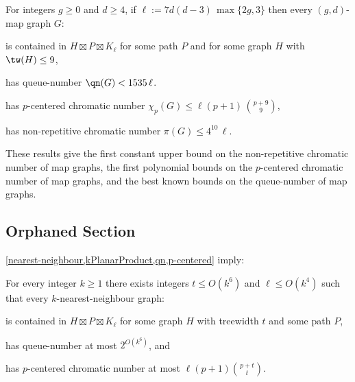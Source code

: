  \begin{thm}
 \label{MapPartition}
 For integers $g\geq 0$ and $d\geq 4$, if $\ell:=  7d(d-3)\, \max\{2g,3\}$ then every $(g,d)$-map graph $G$:
 \begin{compactitem}
 \item is contained in $H \boxtimes P \boxtimes K_{\ell}$ for some path $P$ and for some graph $H$ with $\tw(H)\leq 9$,
 \item has queue-number $\qn(G) <  1535\, \ell $.
 \item has $p$-centered chromatic number $\chi_p(G) \leq \ell (p+1)\,  \binom{p+9}{9}$,
 \item has non-repetitive chromatic number $ \pi(G) \leq 4^{10}\,\ell $.
 \end{compactitem}
 \end{thm}

 These results give the first constant upper bound on the non-repetitive chromatic number of map graphs, the first polynomial bounds on the $p$-centered chromatic number of map graphs, and the best known bounds on the queue-number of map graphs.



  \subsection{Orphaned Section}
 
  \cref{nearest-neighbour,kPlanarProduct,qn,p-centered} imply:
 
  \begin{cor}
  \label{k-nn}
  For every integer $k\geq 1$ there exists integers $t\leq O(k^6)$ and $\ell\leq O(k^4)$ such that every $k$-nearest-neighbour graph:
  \begin{compactitem}
  \item is contained in $H\boxtimes P \boxtimes K_\ell$ for some graph $H$ with treewidth $t$ and some path $P$,
  \item has queue-number at most $2^{O(k^6)}$, and
  \item has $p$-centered chromatic number at most $\ell (p+1)\binom{p+t}{t}$.
  \end{compactitem}
  \end{cor}
 

